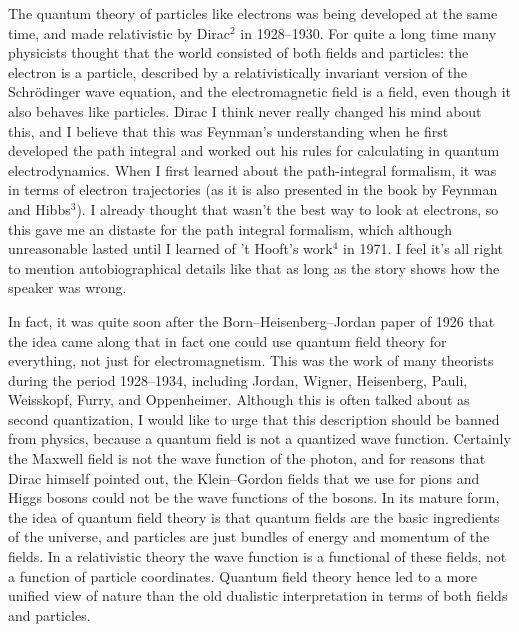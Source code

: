 The quantum theory of particles like electrons was being
developed at the same time, and made relativistic by
Dirac$^2$
in 1928--1930.  For quite a long time many physicists
thought that the world consisted of both fields and
particles:  the electron is a particle, described by a
relativistically invariant version of the Schr\"odinger wave
equation,  and the electromagnetic field is a field, even
though it also behaves like particles.  Dirac I think never
really changed his mind about this, and I believe that this
was Feynman's understanding when he first developed the path
integral and worked out his rules for calculating in quantum
electrodynamics.  When I first learned about the
path-integral formalism, it was in terms of
electron trajectories (as it is also presented in the book
by Feynman and Hibbs$^3$).  I already thought that wasn't
the
best way to look at electrons, so this gave me an
distaste for the path integral formalism, which
although unreasonable lasted until I learned
of 't Hooft's work$^4$ in 1971.  I feel it's all right to
mention autobiographical details like that as long as the
story shows how the speaker was wrong.

In fact, it was quite soon after the
Born--Heisenberg--Jordan paper of 1926 that the idea came
along that in fact
one could use quantum field theory for everything, not just
for electromagnetism.  This was the work of many theorists
during the period 1928--1934, including Jordan, Wigner,
Heisenberg, Pauli, Weisskopf, Furry, and Oppenheimer.
Although this is often talked about as second quantization,
I would like to urge that this description should be banned
from physics, because a quantum field is not a quantized
wave function.  Certainly the Maxwell field is not the wave
function of the photon, and for reasons that Dirac himself
pointed out, the Klein--Gordon fields that we use for pions
and Higgs bosons could not be the wave functions of the
bosons.  In its mature form, the idea of quantum field
theory is that quantum fields are the basic ingredients of
the universe, and particles are just bundles of energy and
momentum of the fields.   In a relativistic theory the  wave
function is a functional of these fields, not a function of
particle coordinates.  Quantum field theory hence led to a
more unified view of nature than the old dualistic
interpretation in terms of both fields and particles.

